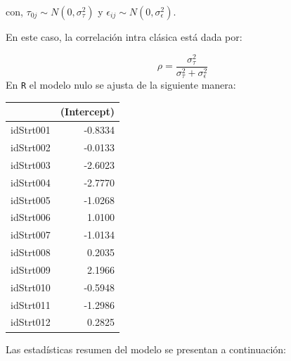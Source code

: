 \documentclass[
  spanish,
  12pt,
]{book}
\newenvironment{Shaded}{\begin{snugshade}}{\end{snugshade}}
\newcommand{\AttributeTok}[1]{\textcolor[rgb]{0.13,0.29,0.53}{#1}}
\newcommand{\DecValTok}[1]{\textcolor[rgb]{0.00,0.00,0.81}{#1}}
\newcommand{\FunctionTok}[1]{\textcolor[rgb]{0.13,0.29,0.53}{\textbf{#1}}}
\newcommand{\NormalTok}[1]{#1}
\newcommand{\OtherTok}[1]{\textcolor[rgb]{0.56,0.35,0.01}{#1}}
\newcommand{\SpecialCharTok}[1]{\textcolor[rgb]{0.81,0.36,0.00}{\textbf{#1}}}
\newcommand{\StringTok}[1]{\textcolor[rgb]{0.31,0.60,0.02}{#1}}
\begin{document}
con,
\(\tau_{0j}\sim N\left(0,\sigma_{\tau}^{2}\right)\) y \(\epsilon_{ij}\sim N\left(0,\sigma_{\epsilon}^{2}\right)\).

En este caso, la correlación intra clásica está dada por:

\[
\rho=\frac{\sigma_{\tau}^{2}}{\sigma_{\tau}^{2}+\sigma_{\epsilon}^{2}}
\]
En \texttt{R} el modelo nulo se ajusta de la siguiente manera:

\begin{Shaded}
\end{Shaded}

\begin{tabular}{l|r}
\hline
  & (Intercept)\\
\hline
idStrt001 & -0.8334\\
\hline
idStrt002 & -0.0133\\
\hline
idStrt003 & -2.6023\\
\hline
idStrt004 & -2.7770\\
\hline
idStrt005 & -1.0268\\
\hline
idStrt006 & 1.0100\\
\hline
idStrt007 & -1.0134\\
\hline
idStrt008 & 0.2035\\
\hline
idStrt009 & 2.1966\\
\hline
idStrt010 & -0.5948\\
\hline
idStrt011 & -1.2986\\
\hline
idStrt012 & 0.2825\\
\hline
\end{tabular}

Las estadísticas resumen del modelo se presentan a continuación:
\end{document}
